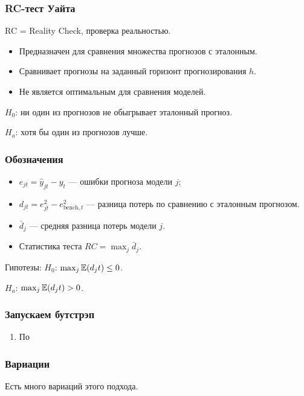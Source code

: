 \begin{frame}
    \frametitle{RC-тест Уайта}

    RC = Reality Check, проверка реальностью. 
    \pause 

    \begin{itemize}
        \item Предназначен для сравнения \alert{множества} прогнозов с эталонным. \pause
        \item Сравнивает прогнозы на \alert{заданный горизонт} прогнозирования $h$. \pause
        \item Не является оптимальным для \alert{сравнения моделей}. \pause
      \end{itemize}

      $H_0$: ни один из прогнозов не обыгрывает эталонный прогноз. 

      $H_a$: хотя бы один из прогнозов лучше. 
\end{frame}

\begin{frame}
    \frametitle{Обозначения}
    
    \begin{itemize}
        \item $e_{jt} = \hat y_{jt} - y_t$ — ошибки прогноза модели $j$; \pause
        \item $d_{jt} = e_{jt}^2 - e_{\text{bench}, t}^2$ — разница потерь по сравнению с эталонным прогнозом. \pause
        \item $\bar d_j$ — средняя разница потерь модели $j$. \pause
        \item Статистика теста $RC = \max_j \bar d_j$.  
    \end{itemize}    
    \pause 
    Гипотезы:
    $H_0$: $\max_j \mathbb{E}(d_jt) \leq 0$. 

    $H_a$: $\max_j \mathbb{E}(d_jt) > 0$.


\end{frame}

\begin{frame}
    \frametitle{Запускаем бутстрэп}

    \begin{enumerate}
        \item По 
    \end{enumerate}
    

\end{frame}


\begin{frame}
    \frametitle{Вариации}

    Есть \alert{много} вариаций этого подхода. 


    

\end{frame}



